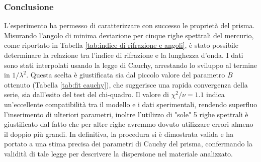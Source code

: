 \documentclass[a4paper]{article}
\begin{document}
\subsubsection{Conclusione}
L'esperimento ha permesso di caratterizzare con successo le proprietà del prisma. Misurando l'angolo di minima deviazione per cinque righe spettrali del mercurio, come riportato in Tabella \ref{tab:indice di rifrazione e angoli}, è stato possibile determinare la relazione tra l'indice di rifrazione e la lunghezza d'onda.
I dati sono stati interpolati usando la legge di Cauchy, arrestando lo sviluppo al termine in $1/\lambda^2$. Questa scelta è giustificata sia dal piccolo valore del parametro $B$ ottenuto (Tabella \ref{tab:fit cauchy}), che suggerisce una rapida convergenza della serie, sia dall'esito del test del chi-quadro. Il valore di $\chi^2/\nu = 1.1$ indica un'eccellente compatibilità tra il modello e i dati sperimentali, rendendo superfluo l'inserimento di ulteriori parametri, inoltre l'utilizzo di "sole" 5 righe spettrali è giustificato dal fatto che per altre righe avremmo dovuto utilizzare errori almeno il doppio più grandi.
In definitiva, la procedura si è dimostrata valida e ha portato a una stima precisa dei parametri di Cauchy del prisma, confermando la validità di tale legge per descrivere la dispersione nel materiale analizzato.
\end{document}
